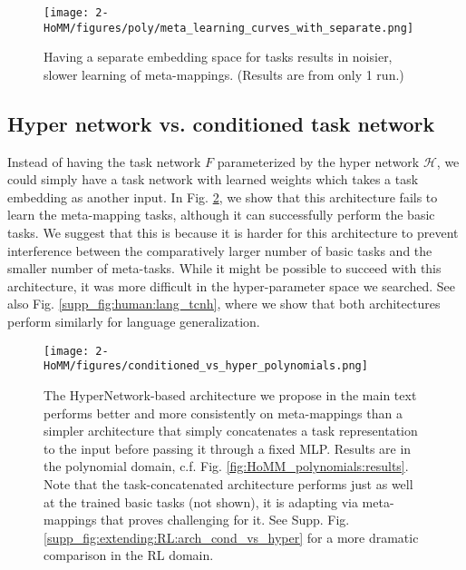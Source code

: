 \begin{figure}[H]
\centering
\texttt{[image: 2-HoMM/figures/poly/meta\_learning\_curves\_with\_separate.png]}
\caption[Having a separate embedding space for tasks results in noisier, slower learning of meta-mappings.]{Having a separate embedding space for tasks results in noisier, slower learning of meta-mappings. (Results are from only 1 run.)}
\label{supp_lesion_shared_z_learn_fig}
\end{figure}

\subsection{Hyper network vs. conditioned task network} \label{app_lesion_results_hyper}
Instead of having the task network $F$ parameterized by the hyper network $\mathcal{H}$, we could simply have a task network with learned weights which takes a task embedding as another input. In Fig. \ref{supp_fig:HoMM_arch_cond_vs_hyper}, we show that this architecture fails to learn the meta-mapping tasks, although it can successfully perform the basic tasks. We suggest that this is because it is harder for this architecture to prevent interference between the comparatively larger number of basic tasks and the smaller number of meta-tasks. While it might be possible to succeed with this architecture, it was more difficult in the hyper-parameter space we searched. See also Fig. \ref{supp_fig:human:lang_tcnh}, where we show that both architectures perform similarly for language generalization. \par 

\begin{figure}[H]
\centering
\texttt{[image: 2-HoMM/figures/conditioned\_vs\_hyper\_polynomials.png]}
\caption[The HyperNetwork-based architecture we propose outperforms a simpler architecture.]{The HyperNetwork-based architecture we propose in the main text performs better and more consistently on meta-mappings than a simpler architecture that simply concatenates a task representation to the input before passing it through a fixed MLP. Results are in the polynomial domain, c.f. Fig. \ref{fig:HoMM_polynomials:results}. Note that the task-concatenated architecture performs just as well at the trained basic tasks (not shown), it is adapting via meta-mappings that proves challenging for it. See Supp. Fig. \ref{supp_fig:extending:RL:arch_cond_vs_hyper} for a more dramatic comparison in the RL domain. }\label{supp_fig:HoMM_arch_cond_vs_hyper}
\end{figure}

